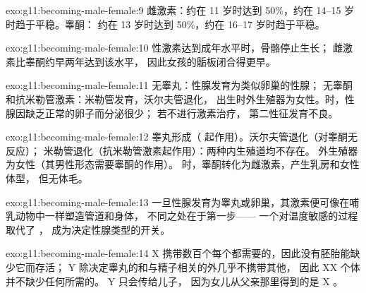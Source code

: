 \begin{solution}{exo:g11:becoming-male-female:9}
雌激素：约在 11 岁时达到 50\%，约在 14--15 岁时趋于平稳。睾酮：
约在 13 岁时达到 50\%，约在 16--17 岁时趋于平稳。
\end{solution}

\begin{solution}{exo:g11:becoming-male-female:10}
性激素达到成年水平时，骨骼停止生长；
雌激素比睾酮约早两年达到该水平，
因此女孩的骺板闭合得更早。
\end{solution}

\begin{solution}{exo:g11:becoming-male-female:11}
无睾丸：性腺发育为类似卵巢的性腺；
无睾酮和抗米勒管激素：米勒管发育，沃尔夫管退化，
出生时外生殖器为女性。时，性腺因缺乏正常的卵子而分泌很少；
若不进行激素治疗，
第二性征发育不良。
\end{solution}

\begin{solution}{exo:g11:becoming-male-female:12}
睾丸形成（ 起作用）。沃尔夫管退化（对睾酮无反应）；
米勒管退化（抗米勒管激素起作用）：两种内生殖道均不存在。
外生殖器为女性（其男性形态需要睾酮的作用）。
时，睾酮转化为雌激素，产生乳房和女性体型，
但无体毛。
\end{solution}

\begin{solution}{exo:g11:becoming-male-female:13}
一旦性腺发育为睾丸或卵巢，其激素便可像在哺乳动物中一样塑造管道和身体，
不同之处在于第一步——
一个对温度敏感的过程取代了 ，
成为决定性腺类型的开关。
\end{solution}

\begin{solution}{exo:g11:becoming-male-female:14}
X 携带数百个每个都需要的，因此没有胚胎能缺少它而存活；
Y 除决定睾丸的和与精子相关的外几乎不携带其他，
因此 XX 个体并不缺少任何所需的。
Y 只会传给儿子，
因为女儿从父亲那里得到的是 X 。
\end{solution}

